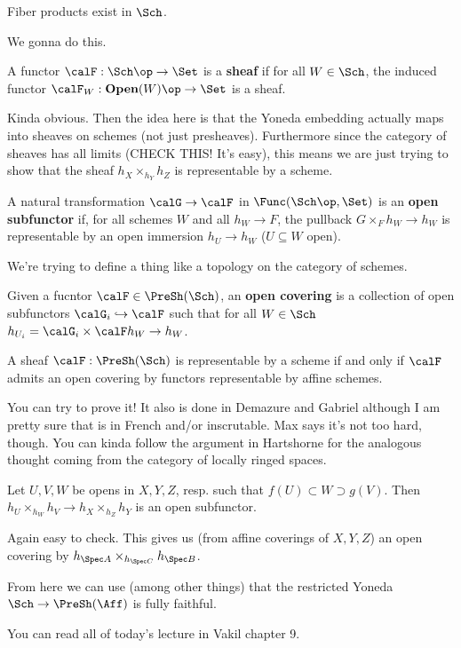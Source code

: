 \documentclass[12pt]{article}
\begin{document}
\begin{thm}
	Fiber products exist in $\Sch$.
\end{thm}
\begin{prf}
	We gonna do this.
	\begin{defn}
		A functor $\calF:\Sch\op\to\Set$ is a \textbf{sheaf} if for all $W\in\Sch$, the induced functor 
		$\calF_W:\mathbf{Open}(W)\op\to\Set$ is a sheaf.
	\end{defn}
	Kinda obvious. Then the idea here is that the Yoneda embedding actually maps into sheaves on schemes (not just presheaves). Furthermore 
	since the category of sheaves has all limits (CHECK THIS! It's easy), this means we are just trying to show that the sheaf $h_X\times_{h_Y}h_Z$ is representable 
	by a scheme.

	\begin{defn}
		A natural transformation $\calG\to \calF$ in $\Func(\Sch\op,\Set)$ is an \textbf{open subfunctor} if, 
		for all schemes $W$ and all $h_W\to F$, the pullback $G\times_F h_W\to h_W$ is representable by 
		an open immersion $h_U\to h_W$ ($U\subseteq W$ open).
	\end{defn}
	We're trying to define a thing like a topology on the category of schemes.
	\begin{defn}
		Given a fucntor $\calF\in\PreSh(\Sch)$, an \textbf{open covering} is a collection of open 
		subfunctors $\calG_i\hookrightarrow\calF$ such that for all $W\in\Sch$ $h_{U_i}=\calG_i\times\calF h_W\to h_W$.
	\end{defn}
	\begin{prop}
		A sheaf $\calF:\PreSh(\Sch)$ is representable by a scheme if and only if $\calF$ admits an open covering by functors 
		representable by affine schemes.
	\end{prop}
	You can try to prove it! It also is done in Demazure and Gabriel although I am pretty sure that is in French and/or inscrutable. 
	Max says it's not too hard, though. You can kinda follow the argument in Hartshorne for the analogous thought coming from the category of locally ringed spaces.

	\begin{lem}
		Let $U,V,W$ be opens in $X,Y,Z$, resp. such that $f(U)\subset W\supset g(V)$. Then $h_U\times_{h_W}h_V\to h_X\times_{h_Z}h_Y$ is an open subfunctor.
	\end{lem}
	Again easy to check. This gives us (from affine coverings of $X,Y,Z$) an open covering by $h_{\Spec A}\times_{h_{\Spec C}}h_{\Spec B}$.

	From here we can use (among other things) that the restricted Yoneda $\Sch\to\PreSh(\Aff)$ is fully faithful.
\end{prf}
You can read all of today's lecture in Vakil chapter 9.
\end{document}

